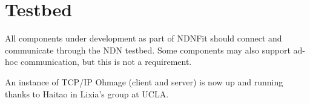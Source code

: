 \section{Testbed}

All components under development as part of NDNFit should connect and communicate through the NDN testbed. Some components may also support ad-hoc communication, but this is not a requirement. 

An instance of TCP/IP Ohmage (client and server) is now up and running thanks to Haitao in Lixia’s group at UCLA.  
